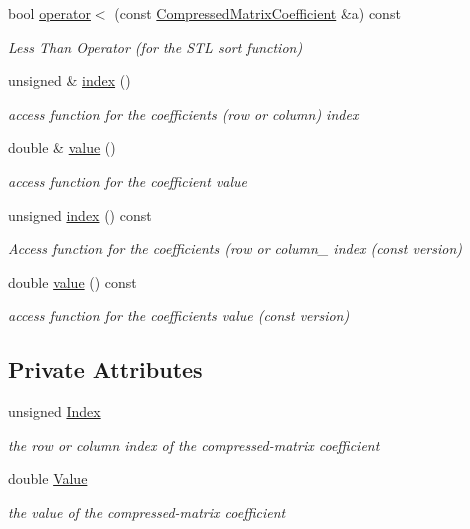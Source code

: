 \begin{DoxyCompactItemize}
bool \hyperlink{classoomph_1_1CompressedMatrixCoefficient_a69f893759bb296dd6fb862b7d3e2fce3}{operator$<$} (const \hyperlink{classoomph_1_1CompressedMatrixCoefficient}{Compressed\+Matrix\+Coefficient} \&a) const
\begin{DoxyCompactList}\small\item\em Less Than Operator (for the S\+TL sort function) \end{DoxyCompactList}\item 
unsigned \& \hyperlink{classoomph_1_1CompressedMatrixCoefficient_a680fdf9009100911ec5c43b53a0dccee}{index} ()
\begin{DoxyCompactList}\small\item\em access function for the coefficient\textquotesingle{}s (row or column) index \end{DoxyCompactList}\item 
double \& \hyperlink{classoomph_1_1CompressedMatrixCoefficient_ad37c133b527ae8ad5aa841ba3d3a29b3}{value} ()
\begin{DoxyCompactList}\small\item\em access function for the coefficient value \end{DoxyCompactList}\item 
unsigned \hyperlink{classoomph_1_1CompressedMatrixCoefficient_acd77daf8774a403432fe019da052c6da}{index} () const
\begin{DoxyCompactList}\small\item\em Access function for the coefficient\textquotesingle{}s (row or column\+\_\+ index (const version) \end{DoxyCompactList}\item 
double \hyperlink{classoomph_1_1CompressedMatrixCoefficient_a8659b8a8c7cb778d337cf58c38a1d24a}{value} () const
\begin{DoxyCompactList}\small\item\em access function for the coefficient\textquotesingle{}s value (const version) \end{DoxyCompactList}\end{DoxyCompactItemize}
\subsection*{Private Attributes}
\begin{DoxyCompactItemize}
\item 
unsigned \hyperlink{classoomph_1_1CompressedMatrixCoefficient_ac39f53e43e7edaa4ba58274e0ed939c4}{Index}
\begin{DoxyCompactList}\small\item\em the row or column index of the compressed-\/matrix coefficient \end{DoxyCompactList}\item 
double \hyperlink{classoomph_1_1CompressedMatrixCoefficient_a8873cbcd41c135197f049bbcec71fa6b}{Value}
\begin{DoxyCompactList}\small\item\em the value of the compressed-\/matrix coefficient \end{DoxyCompactList}\end{DoxyCompactItemize}


